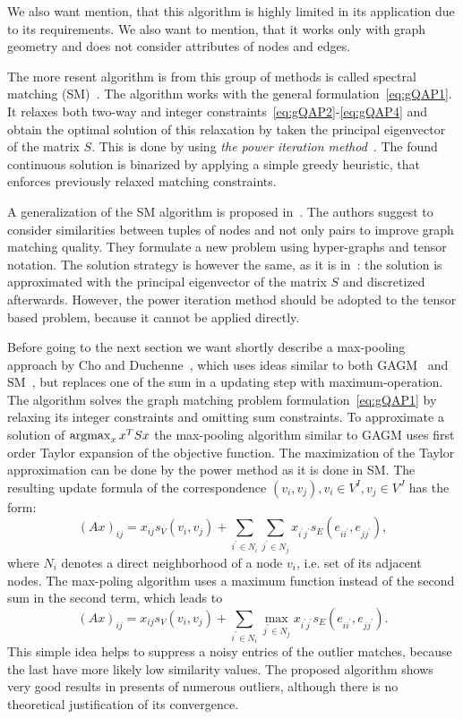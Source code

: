 We also want mention, that this algorithm is highly limited in its application due to its requirements. We also want to mention, that it works only with graph geometry and does not consider attributes of nodes and edges.

The more resent algorithm is from this group of methods is called spectral matching (SM)~\cite{Leordeanu2005_SM}. The algorithm works with the general formulation~\eqref{eq:gQAP1}. It relaxes both two-way and integer constraints~\eqref{eq:gQAP2}-\eqref{eq:gQAP4} and obtain the optimal solution of this relaxation by taken the principal eigenvector of the matrix $S$. This is done by using \emph{the power iteration method}~\cite{PowerIteration}. The found continuous solution is binarized by applying a simple greedy heuristic, that enforces previously relaxed matching constraints.

A generalization of the SM algorithm is proposed in~\cite{Duchenne2011}. The authors suggest to consider similarities between tuples of nodes and not only pairs to improve graph matching quality. They formulate a new problem using hyper-graphs and tensor notation. The solution strategy is however the same, as it is in~\cite{Leordeanu2005_SM}: the solution is approximated with the principal eigenvector of the matrix $S$ and discretized afterwards. However, the power iteration method should be adopted to the tensor based problem, because it cannot be applied directly.

Before going to the next section we want shortly describe a max-pooling approach by Cho and Duchenne~\cite{Cho2014_Haystack}, which uses ideas similar to both GAGM~\cite{Rangarajan1996_GAGM} and SM~\cite{Leordeanu2005_SM}, but replaces one of the sum in a updating step with maximum-operation. The algorithm solves the graph matching problem formulation~\eqref{eq:gQAP1} by relaxing its integer constraints and omitting sum constraints. To approximate a solution of $\mathop{\rm argmax}_{x}x^TSx$ the max-pooling algorithm similar to GAGM uses first order Taylor expansion of the objective function. The maximization of the Taylor approximation can be done by the power method as it is done in SM.
The resulting update formula of the correspondence $(v_i,v_j),v_i\in V^I,v_j\in V^J$ has the form:
\begin{equation}
(Ax)_{ij}=x_{ij}s_V(v_i,v_{j})+\sum_{i^\prime\in N_i}\sum_{j^\prime\in N_j}x_{i^\prime j^\prime}s_E(e_{ii^\prime},e_{jj^\prime}),
\end{equation}
where $N_i$ denotes a direct neighborhood of a node $v_i$, i.e. set of its adjacent nodes.
The max-poling algorithm uses a maximum function instead of the second sum in the second term, which leads to
\begin{equation}
(Ax)_{ij}=x_{ij}s_V(v_i,v_{j})+\sum_{i^\prime\in N_i}\max_{j^\prime\in N_j}x_{i^\prime j^\prime}s_E(e_{ii^\prime},e_{jj^\prime}).
\end{equation}
This simple idea helps to suppress a noisy entries of the outlier matches, because the last have more likely low similarity values. The proposed algorithm shows very good results in presents of numerous outliers, although there is no theoretical justification of its convergence.
